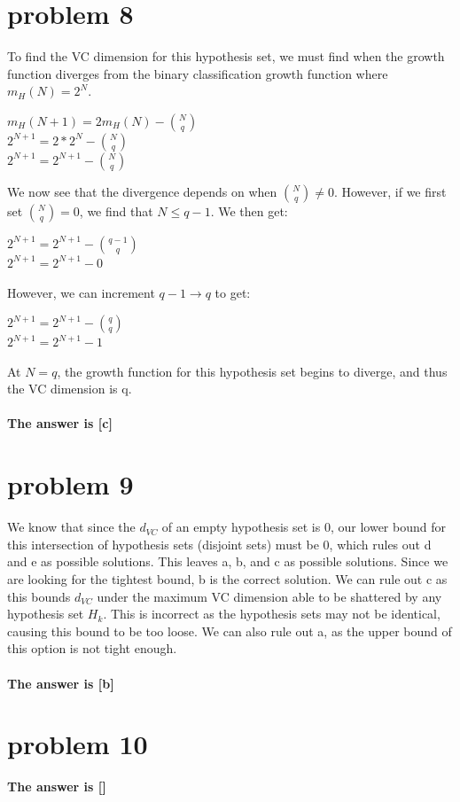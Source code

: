 \documentclass{article}
\begin{document}
\section*{problem 8}
To find the VC dimension for this hypothesis set, we must find when the growth function diverges from the binary classification growth function where $m_H(N) = 2^N$.
\begin{center}
    $m_H(N+1) = 2m_H(N) - {N\choose q}$\\
    $2^{N+1} = 2 * 2^N - {N \choose q}$\\
    $2^{N+1} = 2^{N+1} - {N\choose q}$
\end{center}
We now see that the divergence depends on when ${N\choose q}\neq 0$. However, if we first set ${N\choose q} = 0$, we find that $N \leq q-1$. We then get:
\begin{center}
    $2^{N+1} = 2^{N+1} - {q-1\choose q}$\\
    $2^{N+1} = 2^{N+1} - 0$
\end{center}
However, we can increment $q-1 \rightarrow q$ to get:
\begin{center}
    $2^{N+1} = 2^{N+1} - {q\choose q}$\\
    $2^{N+1} = 2^{N+1} - 1$
\end{center}
At $N=q$, the growth function for this hypothesis set begins to diverge, and thus the VC dimension is q.\\\\
\textbf{The answer is [c]}

\section*{problem 9}
We know that since the $d_{VC}$ of an empty hypothesis set is 0, our lower bound for this intersection of hypothesis sets (disjoint sets) must be 0, which rules out d and e as possible solutions. This leaves a, b, and c as possible solutions. Since we are looking for the tightest bound, b is the correct solution. We can rule out c as this bounds $d_{VC}$ under the maximum VC dimension able to be shattered by any hypothesis set $H_k$. This is incorrect as the hypothesis sets may not be identical, causing this bound to be too loose. We can also rule out a, as the upper bound of this option is not tight enough.\\\\
\textbf{The answer is [b]}

\section*{problem 10}
\textbf{The answer is []}
\end{document}
